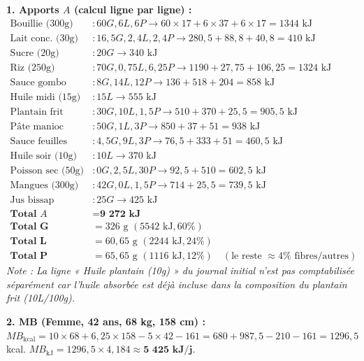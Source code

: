 \documentclass[11pt]{article}
\begin{document}
\begin{corrige}
\textbf{1. Apports $A$ (calcul ligne par ligne) :}
\begin{align*}
\text{Bouillie (300g)} &: 60G, 6L, 6P \rightarrow 60\times17 + 6\times37 + 6\times17 = 1344 \text{ kJ} \\
\text{Lait conc. (30g)} &: 16,5G, 2,4L, 2,4P \rightarrow 280,5 + 88,8 + 40,8 = 410 \text{ kJ} \\
\text{Sucre (20g)} &: 20G \rightarrow 340 \text{ kJ} \\
\text{Riz (250g)} &: 70G, 0,75L, 6,25P \rightarrow 1190 + 27,75 + 106,25 = 1324 \text{ kJ} \\
\text{Sauce gombo (200g)} &: 8G, 14L, 12P \rightarrow 136 + 518 + 204 = 858 \text{ kJ} \\
\text{Huile midi (15g)} &: 15L \rightarrow 555 \text{ kJ} \\
\text{Plantain frit (100g)} &: 30G, 10L, 1,5P \rightarrow 510 + 370 + 25,5 = 905,5 \text{ kJ} \\
\text{Pâte manioc (200g)} &: 50G, 1L, 3P \rightarrow 850 + 37 + 51 = 938 \text{ kJ} \\
\text{Sauce feuilles (150g)} &: 4,5G, 9L, 3P \rightarrow 76,5 + 333 + 51 = 460,5 \text{ kJ} \\
\text{Huile soir (10g)} &: 10L \rightarrow 370 \text{ kJ} \\
\text{Poisson sec (50g)} &: 0G, 2,5L, 30P \rightarrow 92,5 + 510 = 602,5 \text{ kJ} \\
\text{Mangues (300g)} &: 42G, 0L, 1,5P \rightarrow 714 + 25,5 = 739,5 \text{ kJ} \\
\text{Jus bissap (250ml)} &: 25G \rightarrow 425 \text{ kJ} \\
\textbf{Total } A &= \textbf{9 272 kJ} \\
\textbf{Total G} &= 326 \text{ g } (5542 \text{ kJ}, 60\%) \\
\textbf{Total L} &= 60,65 \text{ g } (2244 \text{ kJ}, 24\%) \\
\textbf{Total P} &= 65,65 \text{ g } (1116 \text{ kJ}, 12\%) \quad (\text{le reste } \approx 4\% \text{ fibres/autres})
\end{align*}
\textit{Note : La ligne « Huile plantain (10g) » du journal initial n'est pas comptabilisée séparément car l'huile absorbée est déjà incluse dans la composition du plantain frit (10L/100g).}

\textbf{2. MB (Femme, 42 ans, 68 kg, 158 cm) :}
$MB_{\text{kcal}} = 10\times68 + 6,25\times158 - 5\times42 - 161 = 680 + 987,5 - 210 - 161 = 1296,5$ kcal.
$MB_{\text{kJ}} = 1296,5 \times 4,184 \approx \textbf{5 425 kJ/j}$.


\end{corrige}
\end{document}
